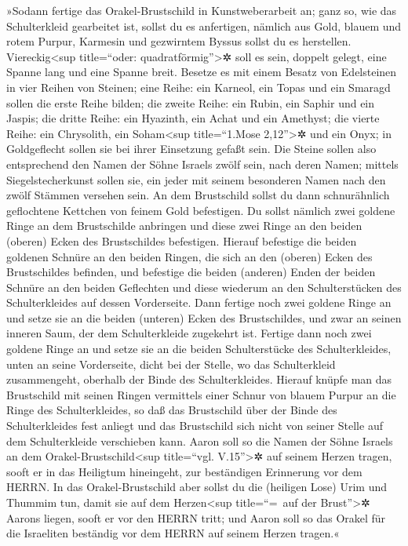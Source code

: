 »Sodann fertige das Orakel-Brustschild in
Kunstweberarbeit an; ganz so, wie das Schulterkleid gearbeitet ist,
sollst du es anfertigen, nämlich aus Gold, blauem und rotem Purpur,
Karmesin und gezwirntem Byssus sollst du es herstellen. 
Viereckig\textless sup title=``oder: quadratförmig''\textgreater✲ soll
es sein, doppelt gelegt, eine Spanne lang und eine Spanne breit.
 Besetze es mit einem Besatz von Edelsteinen in vier
Reihen von Steinen; eine Reihe: ein Karneol, ein Topas und ein Smaragd
sollen die erste Reihe bilden;  die zweite Reihe: ein
Rubin, ein Saphir und ein Jaspis;  die dritte Reihe: ein
Hyazinth, ein Achat und ein Amethyst;  die vierte Reihe:
ein Chrysolith, ein Soham\textless sup title=``1.Mose
2,12''\textgreater✲ und ein Onyx; in Goldgeflecht sollen sie bei ihrer
Einsetzung gefaßt sein.  Die Steine sollen also
entsprechend den Namen der Söhne Israels zwölf sein, nach deren Namen;
mittels Siegelstecherkunst sollen sie, ein jeder mit seinem besonderen
Namen nach den zwölf Stämmen versehen sein.  An dem
Brustschild sollst du dann schnurähnlich geflochtene Kettchen von feinem
Gold befestigen.  Du sollst nämlich zwei goldene Ringe an
dem Brustschilde anbringen und diese zwei Ringe an den beiden (oberen)
Ecken des Brustschildes befestigen.  Hierauf befestige
die beiden goldenen Schnüre an den beiden Ringen, die sich an den
(oberen) Ecken des Brustschildes befinden,  und befestige
die beiden (anderen) Enden der beiden Schnüre an den beiden Geflechten
und diese wiederum an den Schulterstücken des Schulterkleides auf dessen
Vorderseite.  Dann fertige noch zwei goldene Ringe an und
setze sie an die beiden (unteren) Ecken des Brustschildes, und zwar an
seinen inneren Saum, der dem Schulterkleide zugekehrt ist.
 Fertige dann noch zwei goldene Ringe an und setze sie an
die beiden Schulterstücke des Schulterkleides, unten an seine
Vorderseite, dicht bei der Stelle, wo das Schulterkleid zusammengeht,
oberhalb der Binde des Schulterkleides.  Hierauf knüpfe
man das Brustschild mit seinen Ringen vermittels einer Schnur von blauem
Purpur an die Ringe des Schulterkleides, so daß das Brustschild über der
Binde des Schulterkleides fest anliegt und das Brustschild sich nicht
von seiner Stelle auf dem Schulterkleide verschieben kann.
 Aaron soll so die Namen der Söhne Israels an dem
Orakel-Brustschild\textless sup title=``vgl. V.15''\textgreater✲ auf
seinem Herzen tragen, sooft er in das Heiligtum hineingeht, zur
beständigen Erinnerung vor dem HERRN.  In das
Orakel-Brustschild aber sollst du die (heiligen Lose) Urim und Thummim
tun, damit sie auf dem Herzen\textless sup title=``=~auf der
Brust''\textgreater✲ Aarons liegen, sooft er vor den HERRN tritt; und
Aaron soll so das Orakel für die Israeliten beständig vor dem HERRN auf
seinem Herzen tragen.«

